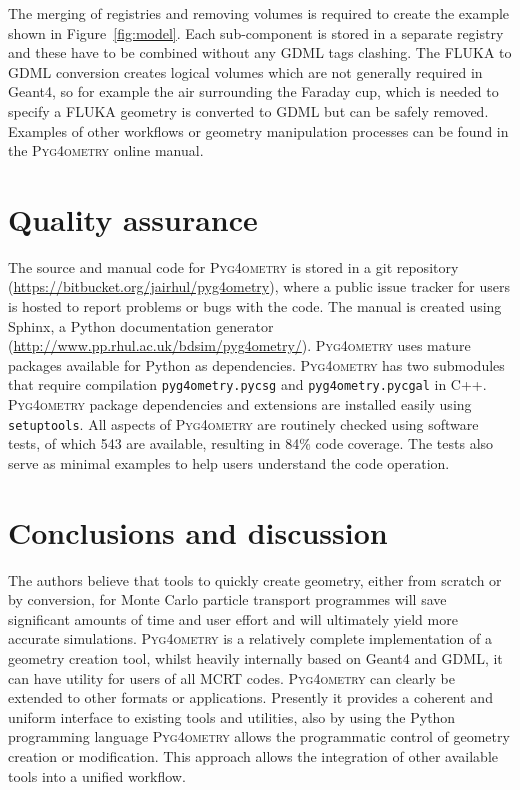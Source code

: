 \documentclass[final,5p,times,twocolumn]{elsarticle}
\newcommand{\pyinline}[1]{\lstinline[postbreak={}]{#1}}
\newcommand{\PYGEOMETRY}{\textsc{Pyg4ometry}}
\begin{document}
The merging of registries and removing volumes is required to create the example shown in Figure~\ref{fig:model}. 
Each sub-component is stored in a separate registry and these have to be combined without any GDML tags clashing. 
The FLUKA to GDML conversion creates logical volumes which are not generally required in Geant4, so for example
the air surrounding the Faraday cup, which is needed to specify a FLUKA geometry is converted to GDML but can be 
safely removed. Examples of other workflows or geometry manipulation processes can be found in 
the \PYGEOMETRY{} online manual.

\section{Quality assurance}
The source and manual code for \PYGEOMETRY{} is stored in a git repository (\url{https://bitbucket.org/jairhul/pyg4ometry}), 
where a public issue tracker for users is hosted to report problems or bugs with the code. The manual is created using Sphinx, a 
Python documentation generator (\url{http://www.pp.rhul.ac.uk/bdsim/pyg4ometry/}). \PYGEOMETRY{} uses mature packages 
available for Python as dependencies. \PYGEOMETRY{} has  two submodules that require compilation \pyinline{pyg4ometry.pycsg} 
and \pyinline{pyg4ometry.pycgal} in C++. \PYGEOMETRY{} package dependencies and extensions are installed easily using 
\pyinline{setuptools}. All aspects of \PYGEOMETRY{} are routinely checked using software tests, of which 543 are available,  
resulting in 84\% code coverage. The tests also serve as minimal examples to help users understand the code operation.

\section{Conclusions and discussion}
The authors believe that tools to quickly create geometry, either from scratch or by conversion,
for Monte Carlo particle transport programmes
will save significant amounts of time and user effort and will ultimately 
yield more accurate simulations. \PYGEOMETRY{} is a relatively complete implementation of a geometry 
creation tool, whilst heavily internally based on Geant4 and GDML, it can have utility for users of all MCRT 
codes. \PYGEOMETRY{} can clearly be extended to other formats or applications. Presently it provides a coherent and 
uniform interface to existing tools and utilities, also by using the Python programming language \PYGEOMETRY{} 
allows the programmatic control of geometry creation or modification. This approach allows the integration of 
other available tools \cite{DavisNIMA915-65} into a unified workflow.
\end{document}
